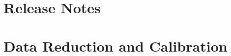 \documentclass[a4paper,10pt]{article}
\begin{document}
\section{Release Notes}


\section{Data Reduction and Calibration}
\end{document}
